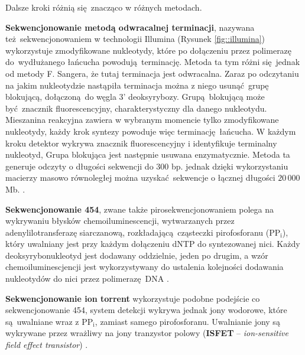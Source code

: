 \documentclass[two column, twoside, a4paper]{article}
\begin{document}
Dalsze kroki różnią się znacząco w różnych metodach.

\textbf{Sekwencjonowanie metodą odwracalnej terminacji}, nazywana też sekwencjonowaniem w technologii Illumina (Rysunek \ref{fig::illumina}) wykorzystuje zmodyfikowane nukleotydy, które po dołączeniu przez polimerazę do wydłużanego łańcucha powodują terminację. Metoda ta tym różni się jednak od metody F. Sangera, że tutaj terminacja jest odwracalna. Zaraz po odczytaniu na jakim nukleotydzie nastąpiła terminacja można z niego usunąć grupę blokującą, dołączoną do węgla 3' deoksyrybozy. Grupą blokującą może być znacznik fluorescencyjny, charakterystyczny dla danego nukleotydu. Mieszanina reakcyjna zawiera w wybranym momencie tylko zmodyfikowane nukleotydy, każdy krok syntezy powoduje więc terminację łańcucha. W każdym kroku detektor wykrywa znacznik fluorescencyjny i identyfikuje terminalny nukleotyd, Grupa blokująca jest następnie usuwana enzymatycznie. Metoda ta generuje odczyty o długości sekwencji do 300 bp. jednak dzięki wykorzystaniu macierzy masowo równoległej można uzyskać sekwencje o łącznej długości $20\,000$ Mb. \autocite{Godwin2016}.

\textbf{Sekwencjonowanie 454}, zwane także pirosekwencjonowaniem polega na wykrywaniu błysków chemoiluminescencji, wytwarzanych przez adenylilotransferazę siarczanową, rozkładającą cząsteczki pirofosforanu ($\mathrm{PP_{i}}$), który uwalniany jest przy każdym dołączeniu dNTP do syntezowanej nici. Każdy deoksyrybonukleotyd jest dodawany oddzielnie, jeden po drugim, a wzór chemoiluminescjencji jest wykorzystywany do ustalenia kolejności dodawania nukleotydów do nici przez polimerazę DNA \autocite{Brown2019} \autocite{Godwin2016}.

\textbf{Sekwencjonowanie ion torrent} wykorzystuje podobne podejście co sekwencjonowanie 454, system detekcji wykrywa jednak jony wodorowe, które są uwalniane wraz z $\mathrm{PP_{i}}$, zamiast samego pirofosforanu. Uwalnianie jony są wykrywane przez wrażliwy na jony tranzystor polowy (\textbf{ISFET} -- \textit{ion-sensitive field effect transistor}) \autocite{Brown2019}.
\end{document}
